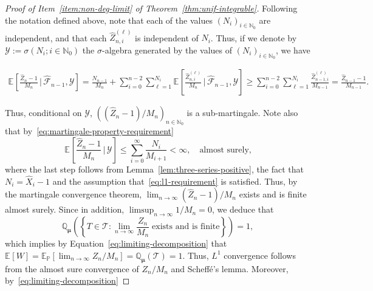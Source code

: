 \documentclass[12pt]{article}
\theoremstyle{definition}
\newcommand{\E}[2][]{\ensuremath{\mathbb{E}_{#1}\left[#2 \right]}}
\newcommand{\Probtwo}[2][]{\ensuremath{\mathbb{Q}_{#1} \left(#2 \right)}}
\begin{document}
\begin{proof}[Proof of Item~\ref{item:non-deg-limit} of Theorem~\ref{thm:unif-integrable}]
Following the notation defined above, note that each of the values $(N_{i})_{i \in \mathbb{N}_0}$ are independent, and that each $\widehat{Z}^{(\ell)}_{n, i}$ is independent of $N_i$. Thus, if we denote by $\mathscr{Y} := \sigma(N_{i};{i \in \mathbb{N}_0})$ the $\sigma$-algebra generated by the values of $(N_{i})_{i \in \mathbb{N}_0}$, we have
\begin{linenomath}
    \begin{align*}
        \E{\frac{\widehat{Z}_{n} - 1}{M_{n}} \, \bigg | \, \widehat{\mathscr{F}}_{n-1},\mathscr{Y}} = 
        \frac{N_{n-1}}{M_{n}} + \sum_{i=0}^{n-2} \sum_{\ell = 1}^{N_{i}} \E{\frac{\widehat{Z}^{(\ell)}_{n, i}}{M_n} \, \bigg | \, \widehat{\mathscr{F}}_{n-1}, \mathscr{Y}} \geq \sum_{i=0}^{n-2} \sum_{\ell = 1}^{N_{i}} \frac{\widehat{Z}^{(\ell)}_{n-1, i}}{M_{n-1}} = \frac{\widehat{Z}_{n-1} - 1}{M_{n-1}}.
    \end{align*}
\end{linenomath}
Thus, conditional on $\mathscr{Y}$, $\left(\left(\widehat{Z}_{n} - 1\right)/M_{n}\right)_{n \in \mathbb{N}_0}$ is a sub-martingale. Note also that by~\eqref{eq:martingale-property-requirement}
\begin{equation} \label{eq:expected-value-infinite-sum}
\E{\frac{\widehat{Z}_{n} - 1}{M_{n}}\, \bigg | \, \mathscr{Y}} \leq \sum_{i=0}^{\infty} \frac{N_{i}}{M_{i+1}} < \infty, \quad {\text{almost surely,}} 
\end{equation}
where the last step follows from Lemma~\eqref{lem:three-series-positive}, the fact that $N_{i} = \widehat{X}_{i}-1$ and the assumption that~\eqref{eq:l1-requirement} is satisfied. Thus, by the martingale convergence theorem, $\lim_{n \to \infty} \left(\widehat{Z}_{n} - 1\right)/M_{n}$ exists and is finite almost surely. Since in addition, $\limsup_{n \to \infty} 1/M_{n} = 0 $, we deduce that  
\begin{equation} \label{eq:limit-exists}
\Probtwo[\boldsymbol{\mu}]{\left\{T \in \mathscr{T}\colon \lim_{n \to \infty} \frac{Z_{n}}{M_{n}} \; \text{exists and is finite}\right\}} = 1,
\end{equation}
which implies by Equation~\eqref{eq:limiting-decomposition} that $\E{W} = \E[\mathbb{P}]{\lim_{n \to \infty} Z_{n}/M_{n}} = \Probtwo[\boldsymbol{\mu}]{\mathscr{T}} = 1$. Thus, $L^1$ convergence follows from the almost sure convergence of $Z_{n}/M_{n}$ and Scheff\'e's lemma. Moreover, by~\eqref{eq:limiting-decomposition}

\end{proof}
\end{document}
